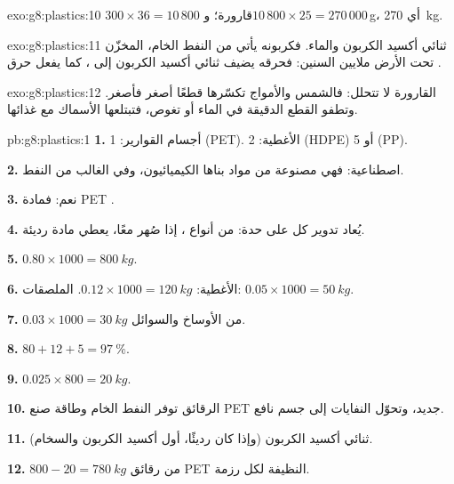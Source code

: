 \begin{solution}{exo:g8:plastics:10}
$300 \times 36 = 10\,800$ قارورة؛ و$10\,800 \times 25 = 270\,000$\,g، أي
\qty{270}{kg}.
\end{solution}

\begin{solution}{exo:g8:plastics:11}
ثنائي أكسيد الكربون والماء. فكربونه يأتي من النفط الخام، المخزّن تحت الأرض
ملايين السنين: فحرقه يضيف ثنائي أكسيد الكربون إلى ، كما يفعل حرق
.
\end{solution}

\begin{solution}{exo:g8:plastics:12}
القارورة لا تتحلل: فالشمس والأمواج تكسّرها قطعًا أصغر فأصغر. وتطفو القطع
الدقيقة في الماء أو تغوص، فتبتلعها الأسماك مع
غذائها.
\end{solution}

\begin{solution}{pb:g8:plastics:1}
\textbf{1.} أجسام القوارير: 1 (PET). الأغطية: 2 (HDPE) أو 5 (PP).

\textbf{2.} اصطناعية: فهي مصنوعة من مواد بناها الكيميائيون، وفي الغالب من
النفط.

\textbf{3.} نعم: فمادة PET .

\textbf{4.} يُعاد تدوير كل  على حدة:  من أنواع ، إذا
صُهر معًا، يعطي مادة رديئة.

\textbf{5.} $0.80 \times 1000 = \qty{800}{kg}$.

\textbf{6.} الأغطية: $0.12 \times 1000 = \qty{120}{kg}$. الملصقات: $0.05
\times 1000 = \qty{50}{kg}$.

\textbf{7.} $0.03 \times 1000 = \qty{30}{kg}$ من الأوساخ والسوائل.

\textbf{8.} $80 + 12 + 5 = \qty{97}{\percent}$.

\textbf{9.} $0.025 \times 800 = \qty{20}{kg}$.

\textbf{10.} الرقائق توفر النفط الخام وطاقة صنع PET جديد، وتحوّل النفايات إلى
جسم نافع.

\textbf{11.} ثنائي أكسيد الكربون (وإذا كان  رديئًا، أول أكسيد الكربون
والسخام).

\textbf{12.} $800 - 20 = \qty{780}{kg}$ من رقائق PET النظيفة لكل رزمة.
\end{solution}
